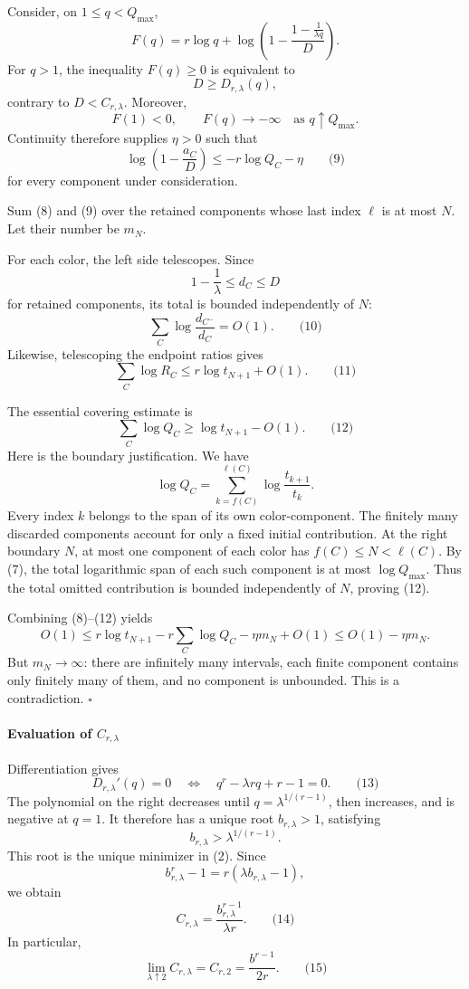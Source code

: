 \documentclass[
  11pt,
  a4paper,
]{article}
\begin{document}
Consider, on \(1\le q<Q_{\max}\), \[
F(q)=r\log q+
\log\left(1-\frac{1-\frac1{\lambda q}}{D}\right).
\] For \(q>1\), the inequality \(F(q)\ge0\) is equivalent to \[
D\ge D_{r,\lambda}(q),
\] contrary to \(D<C_{r,\lambda}\). Moreover, \[
F(1)<0,\qquad
F(q)\longrightarrow-\infty
\quad\text{as }q\uparrow Q_{\max}.
\] Continuity therefore supplies \(\eta>0\) such that \[
\log\left(1-\frac{a_C}{D}\right)
\le-r\log Q_C-\eta
\qquad\text{(9)}
\] for every component under consideration.

Sum (8) and (9) over the retained components whose last index \(\ell\)
is at most \(N\). Let their number be \(m_N\).

For each color, the left side telescopes. Since \[
1-\frac1\lambda\le d_C\le D
\] for retained components, its total is bounded independently of \(N\):
\[
\sum_C\log\frac{d_{C^-}}{d_C}=O(1).
\qquad\text{(10)}
\] Likewise, telescoping the endpoint ratios gives \[
\sum_C\log R_C\le r\log t_{N+1}+O(1).
\qquad\text{(11)}
\]

The essential covering estimate is \[
\sum_C\log Q_C\ge\log t_{N+1}-O(1).
\qquad\text{(12)}
\] Here is the boundary justification. We have \[
\log Q_C
=\sum_{k=f(C)}^{\ell(C)}
\log\frac{t_{k+1}}{t_k}.
\] Every index \(k\) belongs to the span of its own color-component. The
finitely many discarded components account for only a fixed initial
contribution. At the right boundary \(N\), at most one component of each
color has \(f(C)\le N<\ell(C)\). By (7), the total logarithmic span of
each such component is at most \(\log Q_{\max}\). Thus the total omitted
contribution is bounded independently of \(N\), proving (12).

Combining (8)--(12) yields \[
O(1)
\le r\log t_{N+1}-r\sum_C\log Q_C-\eta m_N+O(1)
\le O(1)-\eta m_N.
\] But \(m_N\to\infty\): there are infinitely many intervals, each
finite component contains only finitely many of them, and no component
is unbounded. This is a contradiction. \(\square\)

\paragraph{\texorpdfstring{Evaluation of
\(C_{r,\lambda}\)}{Evaluation of C\_\{r,\textbackslash lambda\}}}\label{evaluation-of-c_rlambda}

Differentiation gives \[
D_{r,\lambda}'(q)=0
\quad\Longleftrightarrow\quad
q^r-\lambda rq+r-1=0.
\qquad\text{(13)}
\] The polynomial on the right decreases until \(q=\lambda^{1/(r-1)}\),
then increases, and is negative at \(q=1\). It therefore has a unique
root \(b_{r,\lambda}>1\), satisfying \[
b_{r,\lambda}>\lambda^{1/(r-1)}.
\] This root is the unique minimizer in (2). Since \[
b_{r,\lambda}^r-1
=r(\lambda b_{r,\lambda}-1),
\] we obtain \[
C_{r,\lambda}
=\frac{b_{r,\lambda}^{r-1}}{\lambda r}.
\qquad\text{(14)}
\] In particular, \[
\lim_{\lambda\uparrow2}C_{r,\lambda}
=C_{r,2}
=\frac{b^{r-1}}{2r}.
\qquad\text{(15)}
\]
\end{document}

